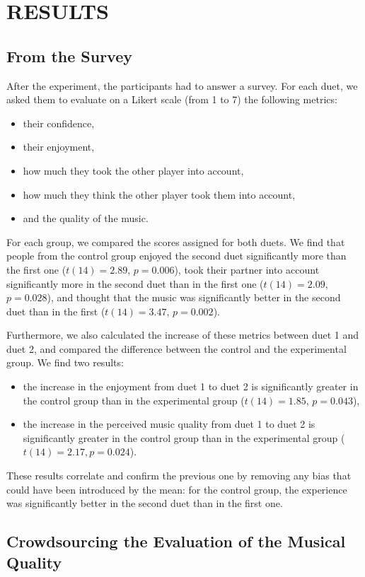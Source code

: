 \documentclass{article}
\begin{document}
\section{RESULTS}

\subsection{From the Survey}

After the experiment, the participants had to answer a survey. For each duet, we asked them to evaluate on a Likert scale (from 1 to 7) the following metrics:
\begin{itemize}
\item their confidence,
\item their enjoyment,
\item how much they took the other player into account,
\item how much they think the other player took them into account,
\item and the quality of the music.
\end{itemize}
For each group, we compared the scores assigned for both duets. We find that people from the control group enjoyed the second duet significantly more than the first one ($t(14) = 2.89$, $p = 0.006$), took their partner into account significantly more in the second duet than in the first one ($t(14) = 2.09$, $p = 0.028$), and thought that the music was significantly better in the second duet than in the first ($t(14) = 3.47$, $p = 0.002$).

Furthermore, we also calculated the increase of these metrics between duet 1 and duet 2, and compared the difference between the control and the experimental group. We find two results:
\begin{itemize}
\item the increase in the enjoyment from duet 1 to duet 2 is significantly greater in the control group than in the experimental group ($t(14) = 1.85$, $p = 0.043$),
\item the increase in the perceived music quality from duet 1 to duet 2 is significantly greater in the control group than in the experimental group ($t(14) = 2.17, p = 0.024$).
\end{itemize}
These results correlate and confirm the previous one by removing any bias that could have been introduced by the mean: for the control group, the experience was significantly better in the second duet than in the first one.


\subsection{Crowdsourcing the Evaluation of the Musical Quality}
\end{document}
